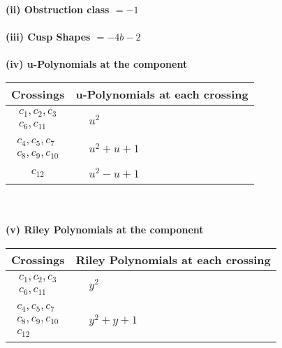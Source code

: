 \documentclass[1p]{elsarticle_modified}
\theoremstyle{definition}
\begin{document}
\flushleft \textbf{(ii) Obstruction class $= -1$}\\~\\
\flushleft \textbf{(iii) Cusp Shapes $= -4 b-2$}\\~\\
\newpage\renewcommand{\arraystretch}{1}
\flushleft \textbf{(iv) u-Polynomials at the component}\newline \\
\begin{tabular}{m{50pt}|m{274pt}}
Crossings & \hspace{64pt}u-Polynomials at each crossing \\
\hline $$\begin{aligned}c_{1},c_{2},c_{3}\\c_{6},c_{11}\end{aligned}$$&$\begin{aligned}
&u^2
\end{aligned}$\\
\hline $$\begin{aligned}c_{4},c_{5},c_{7}\\c_{8},c_{9},c_{10}\end{aligned}$$&$\begin{aligned}
&u^2+u+1
\end{aligned}$\\
\hline $$\begin{aligned}c_{12}\end{aligned}$$&$\begin{aligned}
&u^2- u+1
\end{aligned}$\\
\hline
\end{tabular}\\~\\
\newpage\renewcommand{\arraystretch}{1}
\flushleft \textbf{(v) Riley Polynomials at the component}\newline \\
\begin{tabular}{m{50pt}|m{274pt}}
Crossings & \hspace{64pt}Riley Polynomials at each crossing \\
\hline $$\begin{aligned}c_{1},c_{2},c_{3}\\c_{6},c_{11}\end{aligned}$$&$\begin{aligned}
&y^2
\end{aligned}$\\
\hline $$\begin{aligned}c_{4},c_{5},c_{7}\\c_{8},c_{9},c_{10}\\c_{12}\end{aligned}$$&$\begin{aligned}
&y^2+y+1
\end{aligned}$\\
\hline
\end{tabular}\\~\\
\end{document}
